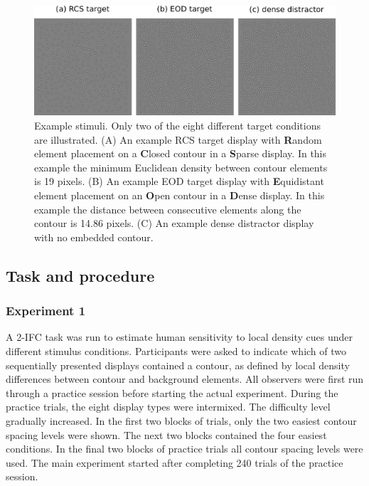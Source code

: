 \documentclass[12pt]{article}
\begin{document}
\begin{figure}[h]
\includegraphics{Figures/FIG_conditions_rendered.png}
\caption{Example stimuli. Only two of the eight different target conditions are illustrated. (A) An example RCS target display with \textbf{R}andom element placement on a \textbf{C}losed contour in a \textbf{S}parse display. In this example the minimum Euclidean density between contour elements is 19 pixels. (B) An example EOD target display with \textbf{E}quidistant element placement on an \textbf{O}pen contour in a \textbf{D}ense display. In this example the distance between consecutive elements along the contour is 14.86 pixels. (C) An example dense distractor display with no embedded contour.}
\label{fig_conditions_rendered}
\end{figure}

\subsection{Task and procedure}\label{subsection_methods_procedure}
\subsubsection{Experiment 1}
A 2-IFC task was run to estimate human sensitivity to local density cues under different stimulus conditions. Participants were asked to indicate which of two sequentially presented displays contained a contour, as defined by local density differences between contour and background elements. All observers were first run through a practice session before starting the actual experiment. During the practice trials, the eight display types were intermixed. The difficulty level gradually increased. In the first two blocks of trials, only the two easiest contour spacing levels were shown. The next two blocks contained the four easiest conditions. In the final two blocks of practice trials all contour spacing levels were used. The main experiment started after completing 240 trials of the practice session.\\
\end{document}
